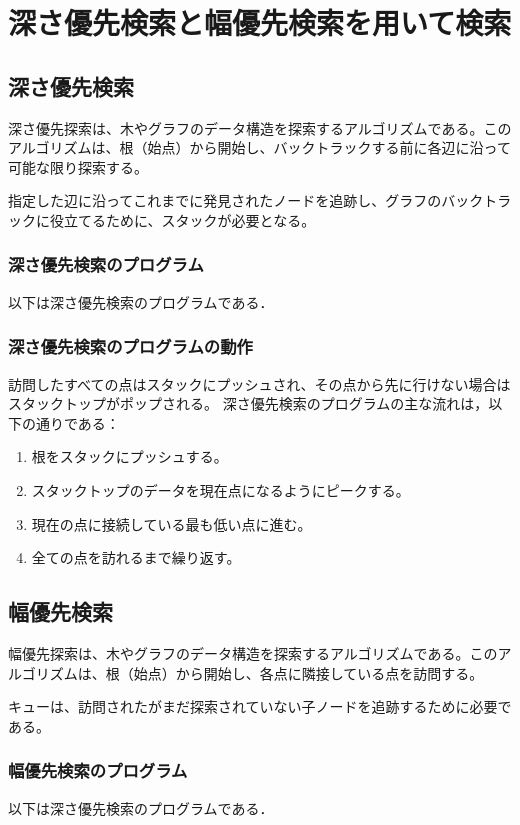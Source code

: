 \documentclass[a4j, titlepage]{jarticle}
\begin{document}
\section{深さ優先検索と幅優先検索を用いて検索}
    \subsection{深さ優先検索}
        深さ優先探索は、木やグラフのデータ構造を探索するアルゴリズムである。このアルゴリズムは、根（始点）から開始し、バックトラックする前に各辺に沿って可能な限り探索する。

        指定した辺に沿ってこれまでに発見されたノードを追跡し、グラフのバックトラックに役立てるために、スタックが必要となる。

        \subsubsection{深さ優先検索のプログラム}
            以下は深さ優先検索のプログラムである．
             
        
        \subsubsection{深さ優先検索のプログラムの動作}
            訪問したすべての点はスタックにプッシュされ、その点から先に行けない場合はスタックトップがポップされる。
            深さ優先検索のプログラムの主な流れは，以下の通りである：
            \begin{screen}
                \begin{enumerate}
                    \item 根をスタックにプッシュする。
                    \item スタックトップのデータを現在点になるようにピークする。
                    \item 現在の点に接続している最も低い点に進む。
                    \item 全ての点を訪れるまで繰り返す。
                \end{enumerate}
            \end{screen}
        
    \subsection{幅優先検索}
        幅優先探索は、木やグラフのデータ構造を探索するアルゴリズムである。このアルゴリズムは、根（始点）から開始し、各点に隣接している点を訪問する。

        キューは、訪問されたがまだ探索されていない子ノードを追跡するために必要である。

        \subsubsection{幅優先検索のプログラム}
            以下は深さ優先検索のプログラムである．
             
            
\end{document}
